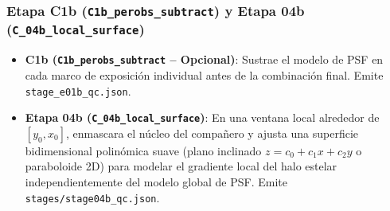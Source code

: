 \documentclass[11pt,a4paper]{article}
\begin{document}
\subsubsection{Etapa C1b (\texttt{C1b\_perobs\_subtract}) y Etapa 04b (\texttt{C\_04b\_local\_surface})}
\begin{itemize}[leftmargin=1.0cm]
    \item \textbf{C1b (\texttt{C1b\_perobs\_subtract} -- Opcional)}: Sustrae el modelo de PSF en cada marco de exposición individual antes de la combinación final. Emite \texttt{stage\_e01b\_qc.json}.
    \item \textbf{Etapa 04b (\texttt{C\_04b\_local\_surface})}: En una ventana local alrededor de $[y_0, x_0]$, enmascara el núcleo del compañero y ajusta una superficie bidimensional polinómica suave (plano inclinado $z = c_0 + c_1 x + c_2 y$ o paraboloide 2D) para modelar el gradiente local del halo estelar independientemente del modelo global de PSF. Emite \texttt{stages/stage04b\_qc.json}.
\end{itemize}
\end{document}
